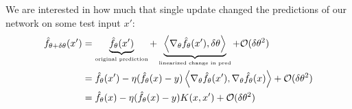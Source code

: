 \documentclass[11pt]{article}
\begin{document}
We are interested in how much that single update changed the predictions of our network on some test input $x'$:
\begin{align}
	\hat f_{\theta + \delta \theta}(x')
		&= \underbrace{\hat f_{\theta}(x')}_{\text{\tiny original prediction}} 
			+ \underbrace{ \left\langle \nabla_{\theta} \hat f_{\theta}(x'), \delta \theta \right\rangle}_{\text{\tiny linearized change in pred}} + \mathcal O(\delta \theta^2) \\
		&= \hat f_{\theta}(x') 
			- \eta (\hat f_{\theta}(x) - y) \left\langle \nabla_{\theta} \hat f_{\theta}(x')  ,  \nabla_{\theta} \hat f_{\theta}(x)  \right\rangle + \mathcal O(\delta \theta^2) \\
		&= \hat f_{\theta}(x) - \eta  (\hat f_{\theta}(x) - y) K(x, x') + \mathcal O(\delta \theta^2) 
\end{align}
\end{document}
